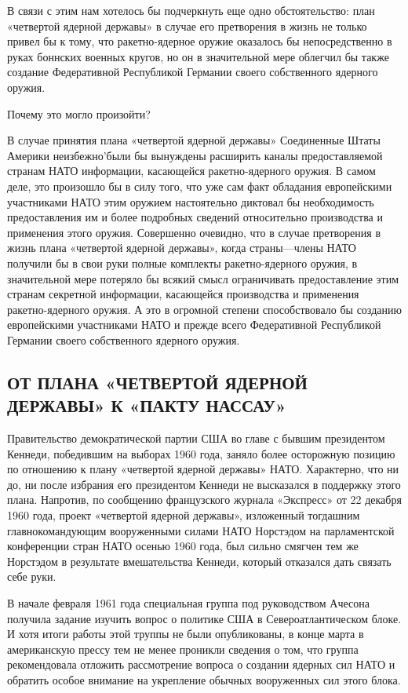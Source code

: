 \documentclass[12pt, a4paper, openany]{book}
\begin{document}
	В связи с этим нам хотелось бы подчеркнуть еще одно обстоятельство: план «четвертой ядерной державы» в случае его претворения в жизнь не только привел бы к тому, что ракетно-ядерное оружие оказалось бы непосредственно в руках боннских военных кругов, но он в значительной мере облегчил бы также создание Федеративной Республикой Германии своего собственного ядерного оружия.
	
	Почему это могло произойти?
	
	В случае принятия плана «четвертой ядерной державы» Соединенные Штаты Америки неизбежно'были бы вынуждены расширить каналы предоставляемой странам НАТО информации, касающейся ракетно-ядерного оружия. В самом деле, это произошло бы в силу того, что уже сам факт обладания европейскими участниками НАТО этим оружием настоятельно диктовал бы необходимость предоставления им и более подробных сведений относительно производства и применения этого оружия. Совершенно очевидно, что в случае претворения в жизнь плана «четвертой ядерной державы», когда страны—члены НАТО получили бы в свои руки полные комплекты ракетно-ядерного оружия, в значительной мере потеряло бы всякий смысл ограничивать предоставление этим странам секретной информации, касающейся производства и применения ракетно-ядерного оружия. А это в огромной степени способствовало бы созданию европейскими участниками НАТО и прежде всего Федеративной Республикой Германии своего собственного ядерного оружия.
	
			\subsection[От плана «четвертой ядерной державы» к «пакту Нассау»]{\center ОТ ПЛАНА «ЧЕТВЕРТОЙ ЯДЕРНОЙ ДЕРЖАВЫ» К «ПАКТУ НАССАУ»}

	
	Правительство демократической партии США во главе с бывшим президентом Кеннеди, победившим на выборах 1960 года, заняло более осторожную позицию по отношению к плану «четвертой ядерной державы» НАТО. Характерно, что ни до, ни после избрания его президентом Кеннеди не высказался в поддержку этого плана. Напротив, по сообщению французского журнала «Экспресс» от 22 декабря 1960 года, проект «четвертой ядерной державы», изложенный тогдашним главнокомандующим вооруженными силами НАТО Норстэдом на парламентской конференции стран НАТО осенью 1960 года, был сильно смягчен тем же Норстэдом в результате вмешательства Кеннеди, который отказался дать связать себе руки.
	
	В начале февраля 1961 года специальная группа под руководством Ачесона получила задание изучить вопрос о политике США в Североатлантическом блоке. И хотя итоги работы этой труппы не были опубликованы, в конце марта в американскую прессу тем не менее проникли сведения о том, что группа рекомендовала отложить рассмотрение вопроса о создании ядерных сил НАТО и обратить особое внимание на укрепление обычных вооруженных сил этого блока.
	
\end{document}
